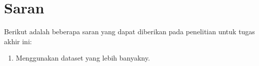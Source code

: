 \section{Saran}
\label{chap:saran}

Berikut adalah beberapa saran yang dapat diberikan pada penelitian untuk tugas akhir ini:

\begin{enumerate}[nolistsep]
	
\item Menggunakan dataset yang lebih banyakny.

\end{enumerate}
